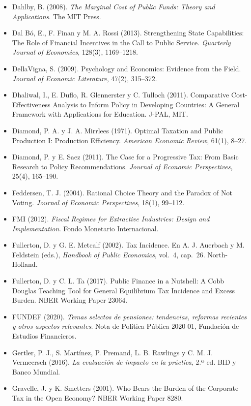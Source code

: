 \documentclass[11pt,a4paper]{article}
\begin{document}
{\begin{itemize}[leftmargin=1.4em,itemsep=1pt,label={}]
\item Dahlby, B. (2008). \emph{The Marginal Cost of Public Funds: Theory and Applications}. The MIT Press.
\item Dal Bó, E., F. Finan y M. A. Rossi (2013). Strengthening State Capabilities: The Role of Financial Incentives in the Call to Public Service. \emph{Quarterly Journal of Economics}, 128(3), 1169--1218.
\item DellaVigna, S. (2009). Psychology and Economics: Evidence from the Field. \emph{Journal of Economic Literature}, 47(2), 315--372.
\item Dhaliwal, I., E. Duflo, R. Glennerster y C. Tulloch (2011). Comparative Cost-Effectiveness Analysis to Inform Policy in Developing Countries: A General Framework with Applications for Education. J-PAL, MIT.
\item Diamond, P. A. y J. A. Mirrlees (1971). Optimal Taxation and Public Production I: Production Efficiency. \emph{American Economic Review}, 61(1), 8--27.
\item Diamond, P. y E. Saez (2011). The Case for a Progressive Tax: From Basic Research to Policy Recommendations. \emph{Journal of Economic Perspectives}, 25(4), 165--190.
\item Feddersen, T. J. (2004). Rational Choice Theory and the Paradox of Not Voting. \emph{Journal of Economic Perspectives}, 18(1), 99--112.
\item FMI (2012). \emph{Fiscal Regimes for Extractive Industries: Design and Implementation}. Fondo Monetario Internacional.
\item Fullerton, D. y G. E. Metcalf (2002). Tax Incidence. En A. J. Auerbach y M. Feldstein (eds.), \emph{Handbook of Public Economics}, vol.~4, cap.~26. North-Holland.
\item Fullerton, D. y C. L. Ta (2017). Public Finance in a Nutshell: A Cobb Douglas Teaching Tool for General Equilibrium Tax Incidence and Excess Burden. NBER Working Paper 23064.
\item FUNDEF (2020). \emph{Temas selectos de pensiones: tendencias, reformas recientes y otros aspectos relevantes}. Nota de Política Pública 2020-01, Fundación de Estudios Financieros.
\item Gertler, P. J., S. Martínez, P. Premand, L. B. Rawlings y C. M. J. Vermeersch (2016). \emph{La evaluación de impacto en la práctica}, 2.ª ed. BID y Banco Mundial.
\item Gravelle, J. y K. Smetters (2001). Who Bears the Burden of the Corporate Tax in the Open Economy? NBER Working Paper 8280.

\end{itemize}}
\end{document}
